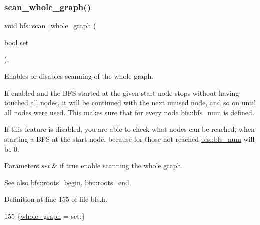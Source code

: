 \mbox{\label{classbfs_a25fc51b1bfbbdd3afefe0a84c1bd2f6b}} 
\subsubsection{\texorpdfstring{scan\+\_\+whole\+\_\+graph()}{scan\_whole\_graph()}\hspace{0.1cm}{\footnotesize\ttfamily [1/2]}}
{\footnotesize\ttfamily void bfs\+::scan\+\_\+whole\+\_\+graph (\begin{DoxyParamCaption}\item[{bool}]{set }\end{DoxyParamCaption})\hspace{0.3cm}{\ttfamily [inline]}, {\ttfamily [inherited]}}



Enables or disables scanning of the whole graph. 

If enabled and the B\+FS started at the given start-\/node stops without having touched all nodes, it will be continued with the next unused node, and so on until all nodes were used. This makes sure that for every node \mbox{\hyperlink{classbfs_a6205cc191bc0bedf1ff9d74af0925735}{bfs\+::bfs\+\_\+num}} is defined.

If this feature is disabled, you are able to check what nodes can be reached, when starting a B\+FS at the start-\/node, because for those not reached \mbox{\hyperlink{classbfs_a6205cc191bc0bedf1ff9d74af0925735}{bfs\+::bfs\+\_\+num}} will be 0.


\begin{DoxyParams}{Parameters}
{\em set} & if true enable scanning the whole graph. \\
\hline
\end{DoxyParams}
\begin{DoxySeeAlso}{See also}
\mbox{\hyperlink{classbfs_a45d58d06d0dcd6427edad2ec52a6ebb9}{bfs\+::roots\+\_\+begin}}, \mbox{\hyperlink{classbfs_ac84b90f777adeb90390689db62602d73}{bfs\+::roots\+\_\+end}} 
\end{DoxySeeAlso}


Definition at line 155 of file bfs.\+h.


\begin{DoxyCode}
155 \{\mbox{\hyperlink{classbfs_a6c08fbcc90d71f1cbdd03a1cdaa9dc99}{whole\_graph}} = \textcolor{keyword}{set};\}
\end{DoxyCode}
\mbox{\label{classbfs_a1378f5cfbc59b036e9215c02563bac23}} 

